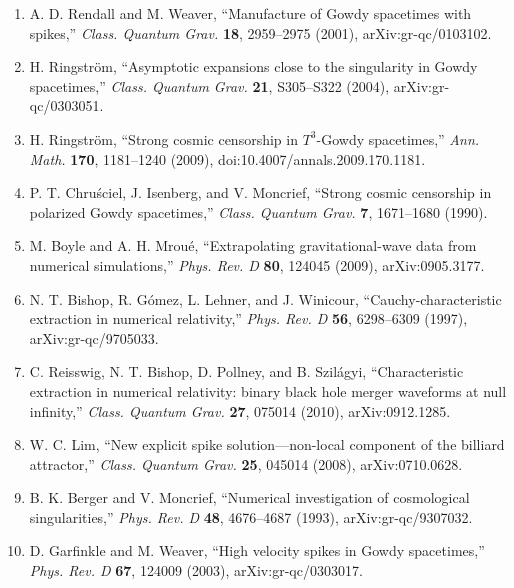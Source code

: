 \documentclass{iopjournal}
\begin{document}
\begin{enumerate}
\item A. D. Rendall and M. Weaver, “Manufacture of Gowdy spacetimes with
spikes,” \emph{Class. Quantum Grav.} \textbf{18}, 2959--2975 (2001), arXiv:gr-qc/0103102.

\item H. Ringström, “Asymptotic expansions close to the singularity in Gowdy
spacetimes,” \emph{Class. Quantum Grav.} \textbf{21}, S305--S322 (2004), arXiv:gr-qc/0303051.

\item H. Ringström, “Strong cosmic censorship in $T^3$-Gowdy spacetimes,”
\emph{Ann. Math.} \textbf{170}, 1181--1240 (2009), doi:10.4007/annals.2009.170.1181.

\item P. T. Chruściel, J. Isenberg, and V. Moncrief, “Strong cosmic censorship
in polarized Gowdy spacetimes,” \emph{Class. Quantum Grav.} \textbf{7}, 1671--1680 (1990).

\item M. Boyle and A. H. Mroué, “Extrapolating gravitational-wave data from
numerical simulations,” \emph{Phys. Rev. D} \textbf{80}, 124045 (2009), arXiv:0905.3177.

\item N. T. Bishop, R. Gómez, L. Lehner, and J. Winicour,
“Cauchy-characteristic extraction in numerical relativity,” \emph{Phys. Rev. D} \textbf{56}, 6298--6309 (1997), arXiv:gr-qc/9705033.

\item C. Reisswig, N. T. Bishop, D. Pollney, and B. Szilágyi,
“Characteristic extraction in numerical relativity: binary black hole merger waveforms at null infinity,” \emph{Class. Quantum Grav.} \textbf{27}, 075014 (2010), arXiv:0912.1285.

\item W. C. Lim, “New explicit spike solution---non-local component of the
billiard attractor,” \emph{Class. Quantum Grav.} \textbf{25}, 045014 (2008), arXiv:0710.0628.

\item B. K. Berger and V. Moncrief, “Numerical investigation of cosmological
singularities,” \emph{Phys. Rev. D} \textbf{48}, 4676--4687 (1993), arXiv:gr-qc/9307032.

\item D. Garfinkle and M. Weaver, “High velocity spikes in Gowdy spacetimes,”
\emph{Phys. Rev. D} \textbf{67}, 124009 (2003), arXiv:gr-qc/0303017.

\end{enumerate}
\end{document}
